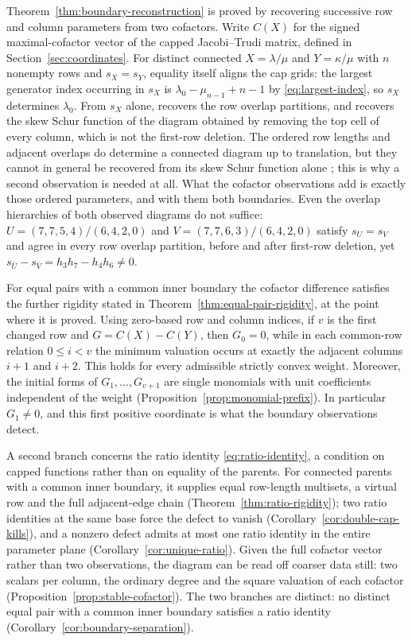 \documentclass[11pt,a4paper]{amsart}
\numberwithin{equation}{section}
\theoremstyle{plain}
\theoremstyle{definition}
\begin{document}
Theorem~\ref{thm:boundary-reconstruction} is proved by recovering successive
row and column parameters from two cofactors.
Write \(C(X)\) for the signed maximal-cofactor vector of the capped
Jacobi--Trudi matrix, defined in Section~\ref{sec:coordinates}.  For distinct
connected \(X=\lambda/\mu\) and \(Y=\kappa/\mu\) with \(n\) nonempty rows
and \(s_X=s_Y\), equality itself aligns the cap grids: the largest generator
index occurring in \(s_X\) is \(\lambda_0-\mu_{n-1}+n-1\) by
\eqref{eq:largest-index}, so \(s_X\) determines \(\lambda_0\).  From \(s_X\) alone, \cite[Cor.~8.11]{Reiner2007Coincidences} recovers the row
overlap partitions, and \cite[Thm.~8.10]{Reiner2007Coincidences} recovers the
skew Schur function of the diagram obtained by removing the top cell of every
column, which is not the first-row deletion.  The ordered row lengths and adjacent overlaps do determine a connected
diagram up to translation, but they cannot in general be recovered from its
skew Schur function alone \cite[discussion preceding Lem.~8.5]{Reiner2007Coincidences};
this is why a second observation is needed at all.  What the cofactor
observations add is exactly those ordered parameters, and with them both
boundaries.  Even the
overlap hierarchies of both observed diagrams do not suffice: \(U=(7,7,5,4)/(6,4,2,0)\)
and \(V=(7,7,6,3)/(6,4,2,0)\) satisfy \(s_U=s_V\) and agree in every row
overlap partition, before and after first-row deletion, yet
\(s_{\bar U}-s_{\bar V}=h_3h_7-h_4h_6\ne0\).

For equal pairs with a common inner boundary the cofactor difference satisfies
the further rigidity stated in Theorem~\ref{thm:equal-pair-rigidity}, at the
point where it is proved.  Using zero-based
row and column indices, if \(v\) is the first changed row and
\(G=C(X)-C(Y)\), then \(G_0=0\), while in each common-row relation
\(0\le i<v\) the minimum valuation occurs at exactly the adjacent columns
\(i+1\) and \(i+2\).  This holds for every admissible strictly convex
weight.  Moreover, the initial forms of \(G_1,\ldots,G_{v+1}\) are single
monomials with unit coefficients independent of the weight
(Proposition~\ref{prop:monomial-prefix}).  In particular \(G_1\ne0\), and
this first positive coordinate is what the boundary observations detect.

A second branch concerns the ratio identity \eqref{eq:ratio-identity}, a
condition on capped functions rather than on equality of the parents.
For connected parents with a common inner boundary, it supplies equal
row-length multisets, a virtual row and the full adjacent-edge chain
(Theorem~\ref{thm:ratio-rigidity}); two ratio identities at the same base force the
defect to vanish (Corollary~\ref{cor:double-cap-kills}), and a nonzero defect
admits at most one ratio identity in the entire parameter plane
(Corollary~\ref{cor:unique-ratio}).  Given the full cofactor vector rather than two
observations, the diagram can be read off coarser data still: two scalars per
column, the ordinary degree and the square valuation of each cofactor
(Proposition~\ref{prop:stable-cofactor}).  The two branches are distinct:
no distinct equal pair with a common inner boundary satisfies a ratio
identity (Corollary~\ref{cor:boundary-separation}).
\end{document}

